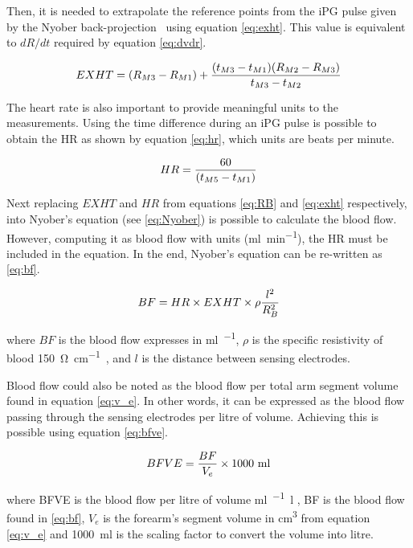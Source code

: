 Then, it is needed to extrapolate the reference points from the iPG pulse given by the Nyober back-projection~\cite{montgomery2011segmental} using equation \ref{eq:exht}. This value is equivalent to $dR/dt$ required by equation \ref{eq:dvdr}.

\begin{align}
	\label{eq:exht}
	EXHT = (R_{M3}-R_{M1}) + \frac{(t_{M3}-t_{M1})(R_{M2}-R_{M3})}{t_{M3}-t_{M2}} \tagaddtext{[\si{\Omega}]}
\end{align}

The heart rate is also important to provide meaningful units to the measurements. Using the time difference during an iPG pulse is possible to obtain the HR as shown by equation \ref{eq:hr}, which units are beats per minute.

\begin{align}
	\label{eq:hr}
	HR = \frac{60}{(t_{M5}-t_{M1})}  \tagaddtext{[\si{bpm}]}
\end{align}

Next replacing $EXHT$ and $HR$ from equations \ref{eq:RB} and \ref{eq:exht} respectively, into Nyober's equation (see \ref{eq:Nyober}) is possible to calculate the blood flow. However, computing it as blood flow with units (\si{\milli\litre\per\minute}), the HR must be included in the equation. In the end, Nyober's equation can be re-written as \ref{eq:bf}. 

\begin{align}
	\label{eq:bf}
	BF = HR \times EXHT \times \rho \frac{l^2}{R_B^2} \tagaddtext{[\si{\ml\per\min}]}
\end{align}

where $BF$ is the blood flow expresses in \si{\milli\litre\per\min}, $\rho$ is the specific resistivity of blood \SI{150}{\ohm\per\cm}~\cite{mohapatra1981non, nyober1950electrical}, and $l$ is the distance between sensing electrodes.

Blood flow could also be noted as the blood flow per total arm segment volume found in equation \ref{eq:v_e}.  In other words, it can be expressed as the blood flow passing through the sensing electrodes per litre of volume. Achieving this is possible using equation \ref{eq:bfve}.

\begin{align}
	\label{eq:bfve}
	BFVE = \frac{BF}{V_e} \times \text{1000 ml} \tagaddtext{[\si{\ml\per\min.\litre}]}
\end{align}

where BFVE is the blood flow per litre of volume \si{\ml\per\min.\litre} , BF is the blood flow found in \ref{eq:bf}, $V_e$ is the forearm's segment volume in \si{\cubic\cm} from equation \ref{eq:v_e} and \SI{1000}{ml} is the scaling factor to convert the volume into litre.

